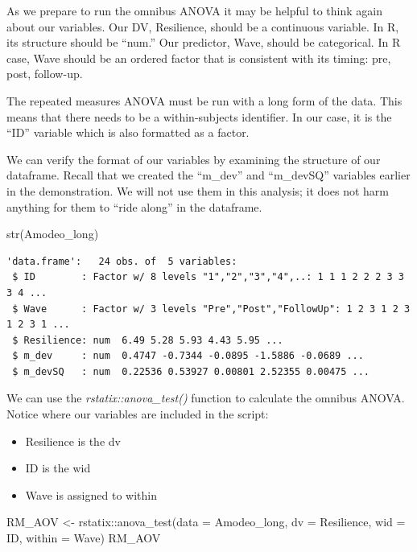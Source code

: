 \documentclass[
  11pt,
]{book}
\newenvironment{Shaded}{\begin{snugshade}}{\end{snugshade}}
\newcommand{\AttributeTok}[1]{\textcolor[rgb]{0.77,0.63,0.00}{#1}}
\newcommand{\FunctionTok}[1]{\textcolor[rgb]{0.00,0.00,0.00}{#1}}
\newcommand{\NormalTok}[1]{#1}
\newcommand{\OtherTok}[1]{\textcolor[rgb]{0.56,0.35,0.01}{#1}}
\newcommand{\SpecialCharTok}[1]{\textcolor[rgb]{0.00,0.00,0.00}{#1}}
\providecommand{\tightlist}{%
  \setlength{\itemsep}{0pt}\setlength{\parskip}{0pt}}
\begin{document}
As we prepare to run the omnibus ANOVA it may be helpful to think again about our variables. Our DV, Resilience, should be a continuous variable. In R, its structure should be ``num.'' Our predictor, Wave, should be categorical. In R case, Wave should be an ordered factor that is consistent with its timing: pre, post, follow-up.

The repeated measures ANOVA must be run with a long form of the data. This means that there needs to be a within-subjects identifier. In our case, it is the ``ID'' variable which is also formatted as a factor.

We can verify the format of our variables by examining the structure of our dataframe. Recall that we created the ``m\_dev'' and ``m\_devSQ'' variables earlier in the demonstration. We will not use them in this analysis; it does not harm anything for them to ``ride along'' in the dataframe.

\begin{Shaded}
\begin{Highlighting}[]
\FunctionTok{str}\NormalTok{(Amodeo\_long)}
\end{Highlighting}
\end{Shaded}

\begin{verbatim}
'data.frame':   24 obs. of  5 variables:
 $ ID        : Factor w/ 8 levels "1","2","3","4",..: 1 1 1 2 2 2 3 3 3 4 ...
 $ Wave      : Factor w/ 3 levels "Pre","Post","FollowUp": 1 2 3 1 2 3 1 2 3 1 ...
 $ Resilience: num  6.49 5.28 5.93 4.43 5.95 ...
 $ m_dev     : num  0.4747 -0.7344 -0.0895 -1.5886 -0.0689 ...
 $ m_devSQ   : num  0.22536 0.53927 0.00801 2.52355 0.00475 ...
\end{verbatim}

We can use the \emph{rstatix::anova\_test()} function to calculate the omnibus ANOVA. Notice where our variables are included in the script:

\begin{itemize}
\tightlist
\item
  Resilience is the dv
\item
  ID is the wid
\item
  Wave is assigned to within
\end{itemize}

\begin{Shaded}
\begin{Highlighting}[]
\NormalTok{RM\_AOV }\OtherTok{\textless{}{-}}\NormalTok{ rstatix}\SpecialCharTok{::}\FunctionTok{anova\_test}\NormalTok{(}\AttributeTok{data =}\NormalTok{ Amodeo\_long, }\AttributeTok{dv =}\NormalTok{ Resilience, }\AttributeTok{wid =}\NormalTok{ ID,}
    \AttributeTok{within =}\NormalTok{ Wave)}
\NormalTok{RM\_AOV}
\end{Highlighting}
\end{Shaded}
\end{document}
